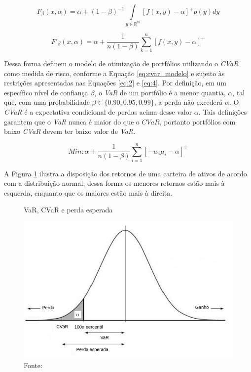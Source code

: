 \documentclass[11pt]{article}
\begin{document}
    \begin{equation} \label{eq:cvar_comb}
        F_{\beta}(x,\alpha) = \alpha + (1-\beta)^{-1} \int\limits_{y \in \mathbb{R}^{m}} [f(x,y) - \alpha]^+ p(y) dy 
    \end{equation}
    
    \begin{equation} \label{cvar3}
        F'_{\beta}(x,\alpha) = \alpha + \frac{1}{n(1-\beta)} \sum_{k=1}^{n}[f(x,y) - \alpha]^+  
    \end{equation}
    
    Dessa forma  definem o modelo de otimização de portfólios utilizando o \textit{CVaR} como medida de risco, conforme a Equação \ref{eq:cvar_modelo} e sujeito às restrições apresentadas nas Equações \ref{eq:2} e \ref{eq:4}. 
    Por definição, em um específico nível de confiança $\beta$, o \textit{VaR} de um portfólio é a menor quantia, $\alpha$, tal que, com uma probabilidade $\beta \in \{0.90, 0.95, 0.99\}$, a perda não excederá $\alpha$. O \textit{CVaR} é a expectativa condicional de perdas acima desse valor $\alpha$. Tais definições garantem que o \textit{VaR} nunca é maior do que o $\textit{CVaR}$, portanto portfólios com baixo \textit{CVaR} devem ter baixo valor de \textit{VaR}. \cite{Rockafellar2000}
    
    \begin{equation} \label{eq:cvar_modelo}
        Min: \alpha + \frac{1}{n(1-\beta)} \sum^{n}_{i=1} [-w_{i}\mu_{i}-\alpha]^+ 
    \end{equation}
    
    
    A Figura \ref{fig:var_cvar} ilustra a disposição dos retornos de uma carteira de ativos de acordo com a distribuição normal, dessa forma os menores retornos estão mais à esquerda, enquanto que os maiores estão mais à direita. 
    
    \begin{figure}[H]
        \centering
        \caption{VaR, CVaR e perda esperada}
        \includegraphics[scale=.53]{figuras/var_cvar.png}
        \caption*{Fonte: }
        \label{fig:var_cvar}
    \end{figure}
    
\end{document}
